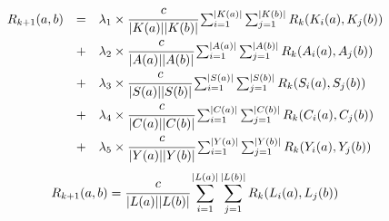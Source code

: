 \[
\begin{array}{lcl}
 R_{k+1}(a,b) & = & 
        \lambda_1\times\cfrac{c}{|K(a)||K(b)|}
        \sum_{i=1}^{|K(a)|} \sum_{j=1}^{|K(b)|} R_k(K_i(a),K_j(b))
        \\ & + &
        \lambda_2\times\cfrac{c}{|A(a)||A(b)|}
        \sum_{i=1}^{|A(a)|} \sum_{j=1}^{|A(b)|} R_k(A_i(a),A_j(b))
        \\ & + &
        \lambda_3\times\cfrac{c}{|S(a)||S(b)|}
        \sum_{i=1}^{|S(a)|} \sum_{j=1}^{|S(b)|} R_k(S_i(a),S_j(b))
        \\ & + &
        \lambda_4\times\cfrac{c}{|C(a)||C(b)|}
        \sum_{i=1}^{|C(a)|} \sum_{j=1}^{|C(b)|} R_k(C_i(a),C_j(b))
        \\ & + &
        \lambda_5\times\cfrac{c}{|Y(a)||Y(b)|}
        \sum_{i=1}^{|Y(a)|} \sum_{j=1}^{|Y(b)|} R_k(Y_i(a),Y_j(b))
\end{array}
\]
\newline
{}
\[
R_{k+1}(a,b)  = 
        \cfrac{c}{|L(a)||L(b)|}
        \sum_{i=1}^{|L(a)|} \sum_{j=1}^{|L(b)|} R_k(L_i(a),L_j(b))
\]


